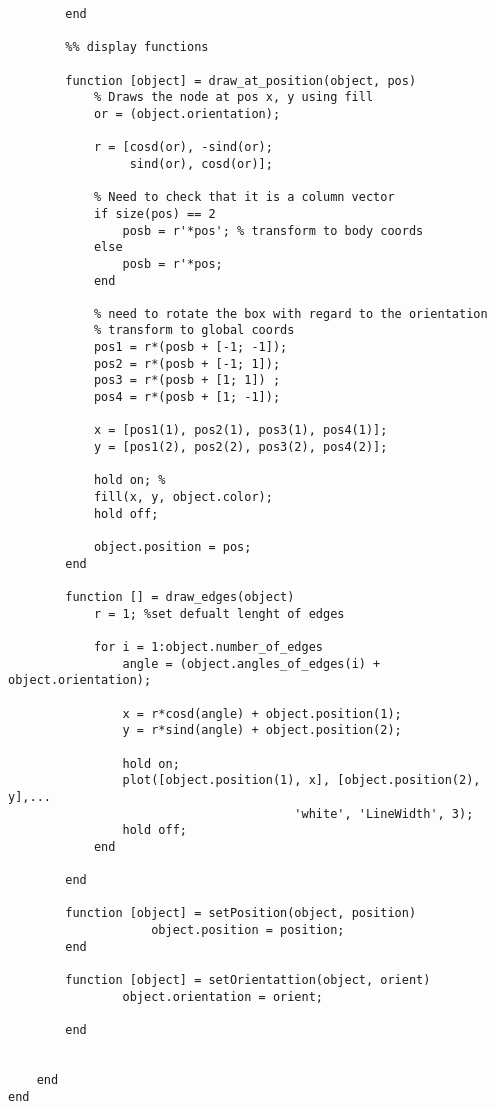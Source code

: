 \begin{lstlisting}
        end
       
        %% display functions
        
        function [object] = draw_at_position(object, pos) 
            % Draws the node at pos x, y using fill
            or = (object.orientation);
            
            r = [cosd(or), -sind(or);
                 sind(or), cosd(or)];
        
            % Need to check that it is a column vector
            if size(pos) == 2 
                posb = r'*pos'; % transform to body coords
            else
                posb = r'*pos;
            end
            
            % need to rotate the box with regard to the orientation
            % transform to global coords
            pos1 = r*(posb + [-1; -1]);
            pos2 = r*(posb + [-1; 1]);
            pos3 = r*(posb + [1; 1]) ;
            pos4 = r*(posb + [1; -1]);
            
            x = [pos1(1), pos2(1), pos3(1), pos4(1)];
            y = [pos1(2), pos2(2), pos3(2), pos4(2)];
            
            hold on; % 
            fill(x, y, object.color);
            hold off;
            
            object.position = pos;
        end
        
        function [] = draw_edges(object)
            r = 1; %set defualt lenght of edges
            
            for i = 1:object.number_of_edges
                angle = (object.angles_of_edges(i) + object.orientation);
                
                x = r*cosd(angle) + object.position(1);
                y = r*sind(angle) + object.position(2);
             
                hold on;
                plot([object.position(1), x], [object.position(2), y],...
                                        'white', 'LineWidth', 3);
                hold off;
            end
        
        end
        
        function [object] = setPosition(object, position)
                    object.position = position;
        end
        
        function [object] = setOrientattion(object, orient)
                object.orientation = orient;
            
        end
        
        
    end 
end
 

\end{lstlisting}


